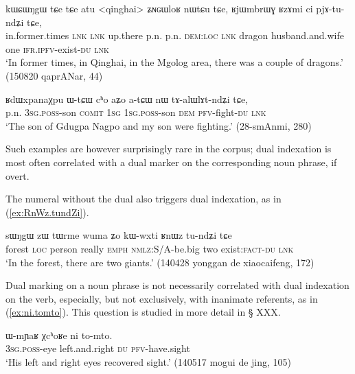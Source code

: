 \begin{exe}
\ex \label{ex:RjWmbrWg.RzAmi}
\gll  kɯɕɯŋgɯ tɕe tɕe atu <qinghai> ʑɴɢɯloʁ nɯtɕu tɕe, ʁjɯmbrɯɣ ʁzɤmi ci pjɤ-tu-ndʑi tɕe,  \\
in.former.times \textsc{lnk}  \textsc{lnk} up.there p.n. p.n. \textsc{dem}:\textsc{loc} \textsc{lnk} dragon husband.and.wife one \textsc{ifr}.\textsc{ipfv}-exist-\textsc{du} \textsc{lnk} \\
\glt `In former times, in Qinghai, in the Mgolog area, there was a couple of dragons.' (150820 qaprANar, 44)
\end{exe}

\begin{exe}
\ex \label{ex:nW.talWlAtndZi}
\gll  ʁdɯxpanaχpu ɯ-tɕɯ cʰo aʑo a-tɕɯ nɯ tɤ-alɯlɤt-ndʑi tɕe, \\
p.n. \textsc{3sg}.\textsc{poss}-son \textsc{comit} \textsc{1sg} \textsc{1sg}.\textsc{poss}-son \textsc{dem} \textsc{pfv}-fight-\textsc{du} \textsc{lnk} \\
\glt `The son of Gdugpa Nagpo and my son were fighting.' (28-smAnmi, 280)
\end{exe}

Such examples are however surprisingly rare in the corpus; dual indexation is most often correlated with a dual marker on the corresponding noun phrase, if overt.

The numeral  without the dual also triggers dual indexation, as in (\ref{ex:RnWz.tundZi}).

\begin{exe}
\ex \label{ex:RnWz.tundZi}
\gll   sɯŋgɯ zɯ tɯrme wuma ʑo kɯ-wxti ʁnɯz tu-ndʑi tɕe\\
forest \textsc{loc} person really \textsc{emph} \textsc{nmlz}:S/A-be.big two exist:\textsc{fact}-\textsc{du} \textsc{lnk}\\
\glt `In the forest, there are two giants.'  (140428 yonggan de xiaocaifeng, 172)
\end{exe}

Dual marking on a noun phrase is not necessarily correlated with dual indexation on the verb, especially, but not exclusively, with inanimate referents, as in (\ref{ex:ni.tomto}). This question is studied in more detail in § XXX.

\begin{exe}
\ex \label{ex:ni.tomto}
\gll  ɯ-mɲaʁ χcʰoʁe ni to-mto. \\
\textsc{3sg}.\textsc{poss}-eye left.and.right \textsc{du} \textsc{pfv}-have.sight \\
\glt `His left and right eyes recovered sight.' (140517 mogui de jing, 105)
\end{exe}

